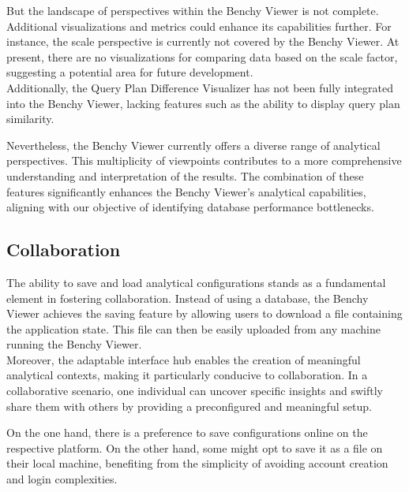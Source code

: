 But the landscape of perspectives within the Benchy Viewer is not complete. Additional visualizations and metrics could enhance its capabilities further. For instance, the scale perspective is currently not covered by the Benchy Viewer. At present, there are no visualizations for comparing data based on the scale factor, suggesting a potential area for future development.\\
Additionally, the Query Plan Difference Visualizer \parencite*{semantic-diff} has not been fully integrated into the Benchy Viewer, lacking features such as the ability to display query plan similarity.

Nevertheless, the Benchy Viewer currently offers a diverse range of analytical perspectives. This multiplicity of viewpoints contributes to a more comprehensive understanding and interpretation of the results. The combination of these features significantly enhances the Benchy Viewer's analytical capabilities, aligning with our objective of identifying database performance bottlenecks.





\subsection{Collaboration}

The ability to save and load analytical configurations stands as a fundamental element in fostering collaboration. Instead of using a database, the Benchy Viewer achieves the saving feature by allowing users to download a file containing the application state. This file can then be easily uploaded from any machine running the Benchy Viewer.\\
Moreover, the adaptable interface hub enables the creation of meaningful analytical contexts, making it particularly conducive to collaboration. In a collaborative scenario, one individual can uncover specific insights and swiftly share them with others by providing a preconfigured and meaningful setup. 

On the one hand, there is a preference to save configurations online on the respective platform. On the other hand, some might opt to save it as a file on their local machine, benefiting from the simplicity of avoiding account creation and login complexities.

